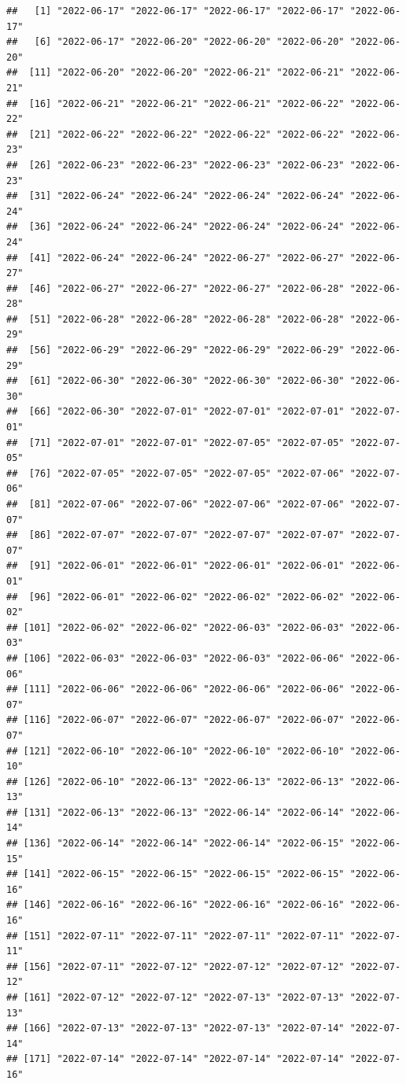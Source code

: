 \documentclass[
]{article}
\begin{document}
\begin{verbatim}
##   [1] "2022-06-17" "2022-06-17" "2022-06-17" "2022-06-17" "2022-06-17"
##   [6] "2022-06-17" "2022-06-20" "2022-06-20" "2022-06-20" "2022-06-20"
##  [11] "2022-06-20" "2022-06-20" "2022-06-21" "2022-06-21" "2022-06-21"
##  [16] "2022-06-21" "2022-06-21" "2022-06-21" "2022-06-22" "2022-06-22"
##  [21] "2022-06-22" "2022-06-22" "2022-06-22" "2022-06-22" "2022-06-23"
##  [26] "2022-06-23" "2022-06-23" "2022-06-23" "2022-06-23" "2022-06-23"
##  [31] "2022-06-24" "2022-06-24" "2022-06-24" "2022-06-24" "2022-06-24"
##  [36] "2022-06-24" "2022-06-24" "2022-06-24" "2022-06-24" "2022-06-24"
##  [41] "2022-06-24" "2022-06-24" "2022-06-27" "2022-06-27" "2022-06-27"
##  [46] "2022-06-27" "2022-06-27" "2022-06-27" "2022-06-28" "2022-06-28"
##  [51] "2022-06-28" "2022-06-28" "2022-06-28" "2022-06-28" "2022-06-29"
##  [56] "2022-06-29" "2022-06-29" "2022-06-29" "2022-06-29" "2022-06-29"
##  [61] "2022-06-30" "2022-06-30" "2022-06-30" "2022-06-30" "2022-06-30"
##  [66] "2022-06-30" "2022-07-01" "2022-07-01" "2022-07-01" "2022-07-01"
##  [71] "2022-07-01" "2022-07-01" "2022-07-05" "2022-07-05" "2022-07-05"
##  [76] "2022-07-05" "2022-07-05" "2022-07-05" "2022-07-06" "2022-07-06"
##  [81] "2022-07-06" "2022-07-06" "2022-07-06" "2022-07-06" "2022-07-07"
##  [86] "2022-07-07" "2022-07-07" "2022-07-07" "2022-07-07" "2022-07-07"
##  [91] "2022-06-01" "2022-06-01" "2022-06-01" "2022-06-01" "2022-06-01"
##  [96] "2022-06-01" "2022-06-02" "2022-06-02" "2022-06-02" "2022-06-02"
## [101] "2022-06-02" "2022-06-02" "2022-06-03" "2022-06-03" "2022-06-03"
## [106] "2022-06-03" "2022-06-03" "2022-06-03" "2022-06-06" "2022-06-06"
## [111] "2022-06-06" "2022-06-06" "2022-06-06" "2022-06-06" "2022-06-07"
## [116] "2022-06-07" "2022-06-07" "2022-06-07" "2022-06-07" "2022-06-07"
## [121] "2022-06-10" "2022-06-10" "2022-06-10" "2022-06-10" "2022-06-10"
## [126] "2022-06-10" "2022-06-13" "2022-06-13" "2022-06-13" "2022-06-13"
## [131] "2022-06-13" "2022-06-13" "2022-06-14" "2022-06-14" "2022-06-14"
## [136] "2022-06-14" "2022-06-14" "2022-06-14" "2022-06-15" "2022-06-15"
## [141] "2022-06-15" "2022-06-15" "2022-06-15" "2022-06-15" "2022-06-16"
## [146] "2022-06-16" "2022-06-16" "2022-06-16" "2022-06-16" "2022-06-16"
## [151] "2022-07-11" "2022-07-11" "2022-07-11" "2022-07-11" "2022-07-11"
## [156] "2022-07-11" "2022-07-12" "2022-07-12" "2022-07-12" "2022-07-12"
## [161] "2022-07-12" "2022-07-12" "2022-07-13" "2022-07-13" "2022-07-13"
## [166] "2022-07-13" "2022-07-13" "2022-07-13" "2022-07-14" "2022-07-14"
## [171] "2022-07-14" "2022-07-14" "2022-07-14" "2022-07-14" "2022-07-16"

\end{verbatim}
\end{document}
